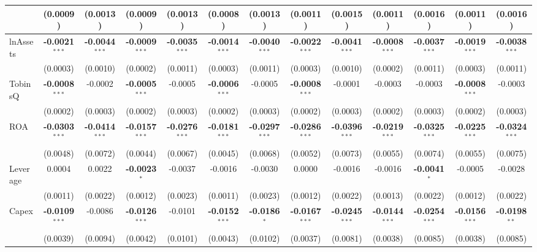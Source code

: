 \documentclass[11pt,a4paper]{article}
\begin{document}
\begin{table}[htbp]
\begin{tabular}{lcccccccccccc}
 & (0.0009) & (0.0013) & (0.0009) & (0.0013) & (0.0008) & (0.0013) & (0.0011) & (0.0015) & (0.0011) & (0.0016) & (0.0011) & (0.0016) \\
\midrule
lnAssets & \textbf{-0.0021}$^{***}$ & \textbf{-0.0044}$^{***}$ & \textbf{-0.0009}$^{***}$ & \textbf{-0.0035}$^{***}$ & \textbf{-0.0014}$^{***}$ & \textbf{-0.0040}$^{***}$ & \textbf{-0.0022}$^{***}$ & \textbf{-0.0041}$^{***}$ & \textbf{-0.0008}$^{***}$ & \textbf{-0.0037}$^{***}$ & \textbf{-0.0019}$^{***}$ & \textbf{-0.0038}$^{***}$ \\
 & (0.0003) & (0.0010) & (0.0002) & (0.0011) & (0.0003) & (0.0011) & (0.0003) & (0.0010) & (0.0002) & (0.0011) & (0.0003) & (0.0011) \\
TobinsQ & \textbf{-0.0008}$^{***}$ & -0.0002 & \textbf{-0.0005}$^{***}$ & -0.0005 & \textbf{-0.0006}$^{***}$ & -0.0005 & \textbf{-0.0008}$^{***}$ & -0.0001 & -0.0003 & -0.0003 & \textbf{-0.0008}$^{***}$ & -0.0003 \\
 & (0.0002) & (0.0003) & (0.0002) & (0.0003) & (0.0002) & (0.0003) & (0.0002) & (0.0003) & (0.0002) & (0.0003) & (0.0002) & (0.0003) \\
ROA & \textbf{-0.0303}$^{***}$ & \textbf{-0.0414}$^{***}$ & \textbf{-0.0157}$^{***}$ & \textbf{-0.0276}$^{***}$ & \textbf{-0.0181}$^{***}$ & \textbf{-0.0297}$^{***}$ & \textbf{-0.0286}$^{***}$ & \textbf{-0.0396}$^{***}$ & \textbf{-0.0219}$^{***}$ & \textbf{-0.0325}$^{***}$ & \textbf{-0.0225}$^{***}$ & \textbf{-0.0324}$^{***}$ \\
 & (0.0048) & (0.0072) & (0.0044) & (0.0067) & (0.0045) & (0.0068) & (0.0052) & (0.0073) & (0.0055) & (0.0074) & (0.0055) & (0.0075) \\
Leverage & 0.0004 & 0.0022 & \textbf{-0.0023}$^{*}$ & -0.0037 & -0.0016 & -0.0030 & 0.0000 & -0.0016 & -0.0016 & \textbf{-0.0041}$^{*}$ & -0.0005 & -0.0028 \\
 & (0.0011) & (0.0022) & (0.0012) & (0.0023) & (0.0011) & (0.0023) & (0.0012) & (0.0022) & (0.0013) & (0.0022) & (0.0012) & (0.0022) \\
Capex & \textbf{-0.0109}$^{***}$ & -0.0086 & \textbf{-0.0126}$^{***}$ & -0.0101 & \textbf{-0.0152}$^{***}$ & \textbf{-0.0186}$^{*}$ & \textbf{-0.0167}$^{***}$ & \textbf{-0.0245}$^{***}$ & \textbf{-0.0144}$^{***}$ & \textbf{-0.0254}$^{***}$ & \textbf{-0.0156}$^{***}$ & \textbf{-0.0198}$^{**}$ \\
 & (0.0039) & (0.0094) & (0.0042) & (0.0101) & (0.0043) & (0.0102) & (0.0037) & (0.0081) & (0.0038) & (0.0085) & (0.0038) & (0.0085) \\

\end{tabular}
\end{table}
\end{document}
